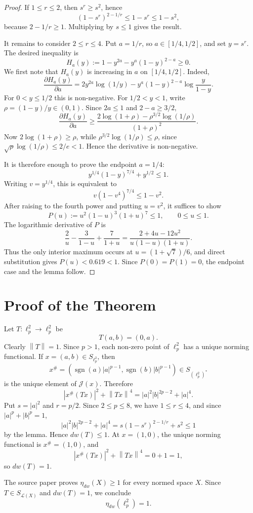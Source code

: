 \documentclass[11pt]{amsart}
\newcommand{\norm}[1]{\left\|#1\right\|}
\begin{document}
\begin{proof}
If \(1\le r\le 2\), then \(s^r\ge s^2\), hence
\[
  (1-s^r)^{2-1/r}\le 1-s^r\le 1-s^2,
\]
because \(2-1/r\ge 1\). Multiplying by \(s\le 1\) gives the result.

It remains to consider \(2\le r\le 4\). Put \(a=1/r\), so
\(a\in[1/4,1/2]\), and set \(y=s^r\). The desired inequality is
\[
  H_a(y):=1-y^{2a}-y^a(1-y)^{2-a}\ge 0.
\]
We first note that \(H_a(y)\) is increasing in \(a\) on
\([1/4,1/2]\). Indeed,
\[
  \frac{\partial H_a(y)}{\partial a}
  =2y^{2a}\log(1/y)
   -y^a(1-y)^{2-a}\log\frac{y}{1-y}.
\]
For \(0<y\le 1/2\) this is non-negative. For \(1/2<y<1\), write
\(\rho=(1-y)/y\in(0,1)\). Since \(2a\le 1\) and \(2-a\ge 3/2\),
\[
\frac{\partial H_a(y)}{\partial a}
\ge
\frac{2\log(1+\rho)-\rho^{3/2}\log(1/\rho)}{(1+\rho)^2}.
\]
Now \(2\log(1+\rho)\ge \rho\), while
\(\rho^{3/2}\log(1/\rho)\le \rho\), since
\(\sqrt{\rho}\log(1/\rho)\le 2/e<1\). Hence the derivative is non-negative.

It is therefore enough to prove the endpoint \(a=1/4\):
\[
  y^{1/4}(1-y)^{7/4}+y^{1/2}\le 1.
\]
Writing \(v=y^{1/4}\), this is equivalent to
\[
  v(1-v^4)^{7/4}\le 1-v^2.
\]
After raising to the fourth power and putting \(u=v^2\), it suffices to show
\[
  P(u):=u^2(1-u)^3(1+u)^7\le 1,\qquad 0\le u\le 1.
\]
The logarithmic derivative of \(P\) is
\[
  \frac{2}{u}-\frac{3}{1-u}+\frac{7}{1+u}
  =
  \frac{2+4u-12u^2}{u(1-u)(1+u)}.
\]
Thus the only interior maximum occurs at \(u=(1+\sqrt 7)/6\), and direct
substitution gives \(P(u)<0.619<1\). Since \(P(0)=P(1)=0\), the endpoint case
and the lemma follow.
\end{proof}

\section*{Proof of the Theorem}

Let \(T:\ell_p^2\to\ell_p^2\) be
\[
  T(a,b)=(0,a).
\]
Clearly \(\norm{T}=1\). Since \(p>1\), each non-zero point of \(\ell_p^2\)
has a unique norming functional. If \(x=(a,b)\in S_{\ell_p^2}\), then
\[
  x^\#=(\operatorname{sgn}(a)|a|^{p-1},
        \operatorname{sgn}(b)|b|^{p-1})\in S_{(\ell_p^2)^*}
\]
is the unique element of \(\mathcal J(x)\). Therefore
\[
  |x^\#(Tx)|^2+\norm{Tx}^4
  =
  |a|^2|b|^{2p-2}+|a|^4.
\]
Put \(s=|a|^2\) and \(r=p/2\). Since \(2\le p\le 8\), we have
\(1\le r\le 4\), and since \(|a|^p+|b|^p=1\),
\[
  |a|^2|b|^{2p-2}+|a|^4
  =
  s(1-s^r)^{2-1/r}+s^2
  \le 1
\]
by the lemma. Hence \(dw(T)\le 1\). At \(x=(1,0)\), the unique norming
functional is \(x^\#=(1,0)\), and
\[
  |x^\#(Tx)|^2+\norm{Tx}^4=0+1=1,
\]
so \(dw(T)=1\).

The source paper proves \(\eta_{dw}(X)\ge 1\) for every normed space \(X\).
Since \(T\in S_{\mathcal L(X)}\) and \(dw(T)=1\), we conclude
\[
  \eta_{dw}(\ell_p^2)=1.
\]
\end{document}
